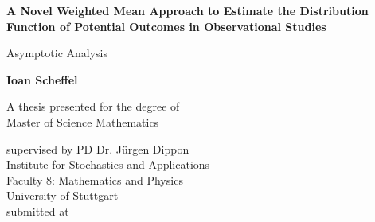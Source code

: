 \documentclass[11pt, a4paper, BCOR=10mm, DIV=11]{scrbook}
\theoremstyle{definition}
\theoremstyle{plain}
\begin{document}
\begin{titlepage}
 \begin{center}
       \vspace*{1cm}
       \textbf{
    A Novel Weighted Mean Approach to Estimate the Distribution Function of Potential Outcomes in Observational Studies 
       }

       \vspace{0.5cm}
       Asymptotic Analysis
            
       \vspace{1.5cm}

       \textbf{Ioan Scheffel}

       \vfill
            
       A thesis presented for the degree of\\
       Master of Science Mathematics
            
       \vspace{0.8cm}
     
      
       supervised by PD Dr. Jürgen Dippon
       \\
            Institute for Stochastics and Applications
            \\
       Faculty 8: Mathematics and Physics
       \\
University of Stuttgart
\\
submitted at
   \end{center}
\end{titlepage}
\end{document}

